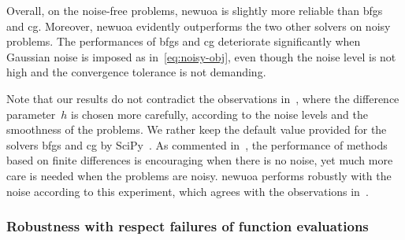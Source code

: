 \documentclass[
    smallextended,  %
    final,        %
]{svjour3}
\begin{document}
Overall, on the noise-free problems, \gls{newuoa} is slightly more reliable than \gls{bfgs} and \gls{cg}.
Moreover, \gls{newuoa} evidently outperforms the two other solvers on noisy problems.
The performances of \gls{bfgs} and \gls{cg} deteriorate significantly when Gaussian noise is imposed as in~\eqref{eq:noisy-obj}, even though the noise level is not high and the convergence tolerance is not demanding.

Note that our results do not contradict the observations in~\cite{Shi_Etal_2022}, where the difference parameter~$h$ is chosen more carefully, according to the noise levels and the smoothness of the problems.
We rather keep the default value provided for the solvers \gls{bfgs} and \gls{cg} by SciPy~\cite{Virtanen_Etal_2020}.
As commented in~\cite{Shi_Etal_2022}, the performance of methods based on finite differences is encouraging when there is no noise, yet much more care is needed when the problems are noisy.
\Gls{newuoa} performs robustly with the noise according to this experiment, which agrees with the observations in~\cite{Shi_Etal_2022}.

\subsubsection{Robustness with respect failures of function evaluations}


\end{document}
